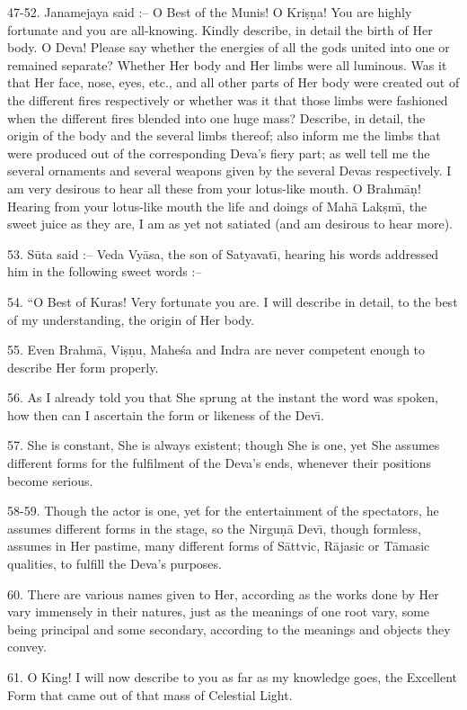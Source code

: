 47-52. Janamejaya said :-- O Best of the Munis! O Kri\d{s}\d{n}a! You are highly fortunate and you are all-knowing. Kindly describe, in detail the birth of Her body. O Deva! Please say whether the energies of all the gods united into one or remained separate? Whether Her body and Her limbs were all luminous. Was it that Her face, nose, eyes, etc., and all other parts of Her body were created out of the different fires respectively or whether was it that those limbs were fashioned when the different fires blended into one huge mass? Describe, in detail, the origin of the body and the several limbs thereof; also inform me the limbs that were produced out of the corresponding Deva's fiery part; as well tell me the several ornaments and several weapons given by the several Devas respectively. I am very desirous to hear all these from your lotus-like mouth. O Brahm\=a\d{n}! Hearing from your lotus-like mouth the life and doings of Mah\=a Lak\d{s}m\={\i}, the sweet juice as they are, I am as yet not satiated (and am desirous to hear more).

53. S\=uta said :-- Veda Vy\=asa, the son of Satyavat\={\i}, hearing his words addressed him in the following sweet words :--

54. ``O Best of Kuras! Very fortunate you are. I will describe in detail, to the best of my understanding, the origin of Her body.

55. Even Brahm\=a, Vi\d{s}\d{n}u, Mahe\'sa and Indra are never competent enough to describe Her form properly.

56. As I already told you that She sprung at the instant the word was spoken, how then can I ascertain the form or likeness of the Dev\={\i}.

57. She is constant, She is always existent; though She is one, yet She assumes different forms for the fulfilment of the Deva's ends, whenever their positions become serious.

58-59. Though the actor is one, yet for the entertainment of the spectators, he assumes different forms in the stage, so the Nirgu\d{n}\=a Dev\={\i}, though formless, assumes in Her pastime, many different forms of S\=attvic, R\=ajasic or T\=amasic qualities, to fulfill the Deva's purposes.

60. There are various names given to Her, according as the works done by Her vary immensely in their natures, just as the meanings of one root vary, some being principal and some secondary, according to the meanings and objects they convey.

61. O King! I will now describe to you as far as my knowledge goes, the Excellent Form that came out of that mass of Celestial Light.

